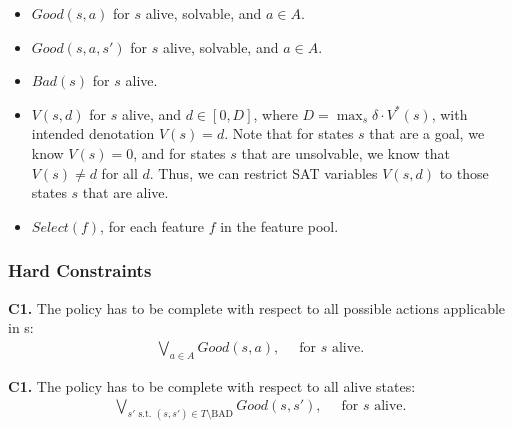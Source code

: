 \documentclass[a4paper]{article}
\newcommand{\smallpar}[1]{{\vspace{10pt}\noindent \bf #1.}}
\newcommand{\badtx}{\ensuremath{\mathrm{BAD}}}
\begin{document}
\begin{itemize}
 \item $Good(s, a)$ for $s$ alive, solvable, and $a \in A$.
 \item $Good(s, a, s')$ for $s$ alive, solvable, and $a \in A$.

 \item $Bad(s)$ for $s$ alive.


 \item $V(s, d)$ for $s$ alive, and $d \in [0, D]$, where $D = \max_{s} \delta \cdot V^*(s)$,
 with intended denotation $V(s)=d$.
 Note that for states $s$ that are a goal, we know $V(s)=0$,
 and for states $s$ that are unsolvable, we know that $V(s) \neq d$ for all $d$.
 Thus, we can restrict SAT variables $V(s, d)$ to those states $s$ that are alive.

 \item $Select(f)$, for each feature $f$ in the feature pool.
\end{itemize}



\subsubsection{Hard Constraints}

\smallpar{C1}
The policy has to be complete with respect to all possible actions applicable in s:
\begin{align}
\bigvee_{a \in A} Good(s, a),&\;\; \text{for $s$ alive.}
\end{align}

\smallpar{C1}
The policy has to be complete with respect to all alive states:
\begin{align}
\bigvee_{s' \text{ s.t. } (s, s') \in T \setminus \badtx} Good(s, s'),&\;\; \text{for $s$ alive.}
\end{align}
\end{document}
